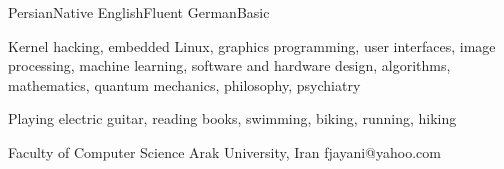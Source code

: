 \documentclass[a4paper,12pt]{memoir} %
\begin{document}



\SmallSep %


\Sep %




\CVLanguageSet
{Persian}{Native}
{English}{Fluent}
{German}{Basic}


\Sep %




{Kernel hacking, embedded Linux, graphics
programming, user interfaces, image processing,
machine learning, software and hardware design,
algorithms, mathematics, quantum mechanics,
philosophy, psychiatry}


{Playing electric guitar, reading books,
swimming, biking, running, hiking}


\Sep %




{Faculty of Computer Science}
{Arak University, Iran}
{fjayani@yahoo.com}

\end{document}
